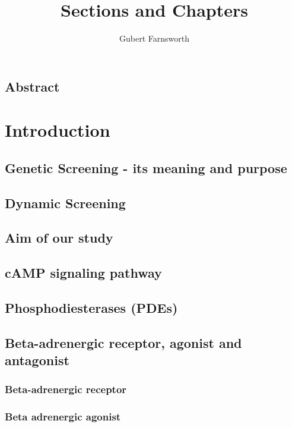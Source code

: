 \documentclass[a4paper,11pt,oneside]{book}
\title{Sections and Chapters}
\author{Gubert Farnsworth}
\date{ }
\begin{document}
\maketitle

\tableofcontents

\newpage
\section*{Abstract}

\chapter{Introduction}


\section{Genetic Screening - its meaning and purpose}


\section{Dynamic Screening}


\section{Aim of our study}


\section{cAMP signaling pathway}


\section{Phosphodiesterases (PDEs)}


\section{Beta-adrenergic receptor, agonist and antagonist }


\subsection{Beta-adrenergic receptor}


\subsection{Beta adrenergic agonist}
\end{document}
